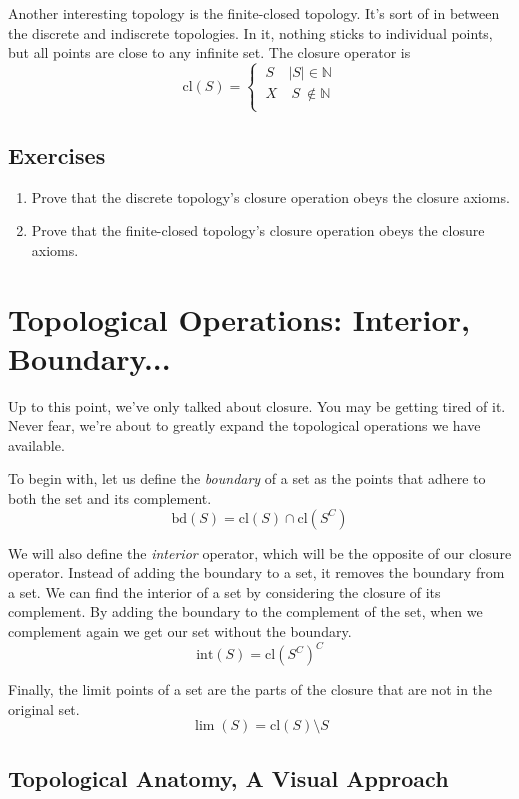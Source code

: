 \documentclass{report}
\newcommand{\cl}{\mathrm{cl}}
\newcommand{\intr}{\mathrm{int}}
\newcommand{\bd}{\mathrm{bd}}
\begin{document}
Another interesting topology is the finite-closed topology. It's sort of in between the discrete and indiscrete topologies. In it, nothing sticks to individual points, but all points are close to any infinite set. The closure operator is $$\cl(S) = \begin{cases} ~S & |S| ∈ ℕ\\ ~X & ~S~ \not\in ℕ\\ \end{cases} $$

\subsection*{Exercises}

\begin{enumerate}

\item Prove that the discrete topology's closure operation obeys the closure axioms.
\item Prove that the finite-closed topology's closure operation obeys the closure axioms.
\end{enumerate}

\section{Topological Operations: Interior, Boundary...}

Up to this point, we've only talked about closure. You may be getting tired of it. Never fear, we're about to greatly expand the topological operations we have available.

To begin with, let us define the \emph{boundary} of a set as the points that adhere to both the set and its complement. $$\bd(S) = \cl(S)∩\cl(S^C)$$

We will also define the \emph{interior} operator, which will be the opposite of our closure operator. Instead of adding the boundary to a set, it removes the boundary from a set. We can find the interior of a set by considering the closure of its complement. By adding the boundary to the complement of the set, when we complement again we get our set without the boundary. $$\intr(S) = \cl(S^C)^C$$

Finally, the limit points of a set are the parts of the closure that are not in the original set. $$\lim(S) = \cl(S) \setminus S$$

\subsection*{Topological Anatomy, A Visual Approach}
\end{document}
